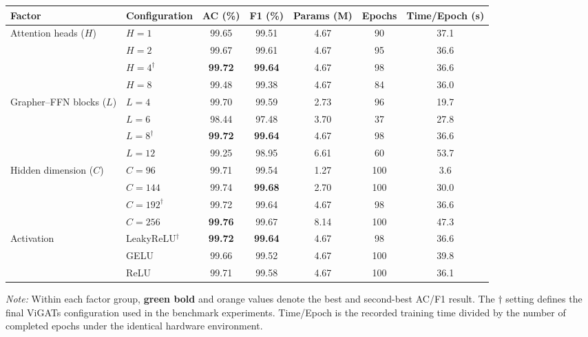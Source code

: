 \documentclass[]{interact}
\theoremstyle{plain}
\theoremstyle{definition}
\theoremstyle{remark}
\newcommand{\bestresult}[1]{\textcolor{bestgreen}{\textbf{#1}}}
\newcommand{\secondresult}[1]{\textcolor{secondorange}{#1}}
\begin{document}
{\begin{table}[H]
\footnotesize
\setlength{\tabcolsep}{4pt}
{\begin{tabular}{llccccc} \toprule
\textbf{Factor} & \textbf{Configuration} & \textbf{AC (\%)} & \textbf{F1 (\%)} & \textbf{Params (M)} & \textbf{Epochs} & \textbf{Time/Epoch (s)} \\ \midrule
\multirow{4}{*}{Attention heads ($H$)} & $H=1$ & 99.65 & 99.51 & 4.67 & 90 & 37.1 \\
 & $H=2$ & \secondresult{99.67} & \secondresult{99.61} & 4.67 & 95 & 36.6 \\
 & $H=4^{\dagger}$ & \bestresult{99.72} & \bestresult{99.64} & 4.67 & 98 & 36.6 \\
 & $H=8$ & 99.48 & 99.38 & 4.67 & 84 & 36.0 \\
\midrule
\multirow{4}{*}{Grapher--FFN blocks ($L$)} & $L=4$ & \secondresult{99.70} & \secondresult{99.59} & 2.73 & 96 & 19.7 \\
 & $L=6$ & 98.44 & 97.48 & 3.70 & 37 & 27.8 \\
 & $L=8^{\dagger}$ & \bestresult{99.72} & \bestresult{99.64} & 4.67 & 98 & 36.6 \\
 & $L=12$ & 99.25 & 98.95 & 6.61 & 60 & 53.7 \\
\midrule
\multirow{4}{*}{Hidden dimension ($C$)} & $C=96$ & 99.71 & 99.54 & 1.27 & 100 & 3.6 \\
 & $C=144$ & \secondresult{99.74} & \bestresult{99.68} & 2.70 & 100 & 30.0 \\
 & $C=192^{\dagger}$ & 99.72 & 99.64 & 4.67 & 98 & 36.6 \\
 & $C=256$ & \bestresult{99.76} & \secondresult{99.67} & 8.14 & 100 & 47.3 \\
\midrule
\multirow{3}{*}{Activation} & LeakyReLU$^{\dagger}$ & \bestresult{99.72} & \bestresult{99.64} & 4.67 & 98 & 36.6 \\
 & GELU & 99.66 & 99.52 & 4.67 & 100 & 39.8 \\
 & ReLU & \secondresult{99.71} & \secondresult{99.58} & 4.67 & 100 & 36.1 \\
\bottomrule
\end{tabular}}
\label{tab:ablation_ext}
\parbox{\textwidth}{\vspace{2pt}\footnotesize\textit{Note:} Within each factor group, \bestresult{green bold} and \secondresult{orange} values denote the best and second-best AC/F1 result. The $\dagger$ setting defines the final ViGATs configuration used in the benchmark experiments. Time/Epoch is the recorded training time divided by the number of completed epochs under the identical hardware environment.}
\end{table}

}
\end{document}
